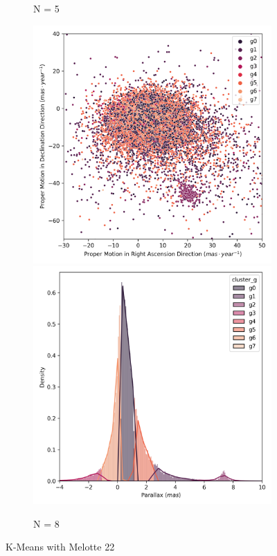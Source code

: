 \documentclass[11pt,a4paper,english,twocolumn]{article}
\begin{document}
\begin{figure}[!htbp]
\begin{subfigure}[b]{0.3\textwidth}
      \caption{N = 5}
  \end{subfigure}
  \medskip
  \begin{subfigure}[b]{0.3\textwidth}
    \centering
      \includegraphics[width=\textwidth]{../figures/kmeans/kmeans_n8_pm_melotte_22.png}
      \includegraphics[width=\textwidth]{../figures/kmeans/kmeans_n8_parallax_melotte_22.png}
      \caption{N = 8}
  \end{subfigure}
  \caption{K-Means with Melotte 22}
  \label{fig:kmeans_comparisons_melotte_22}
\end{figure}
\end{document}
